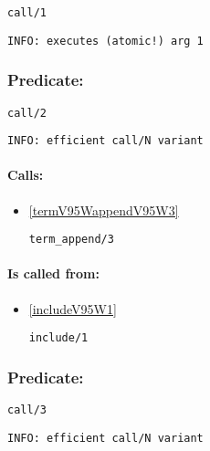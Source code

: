 \begin{verbatim}
call/1
\end{verbatim}

{\small \begin{verbatim}
INFO: executes (atomic!) arg 1

\end{verbatim}}

\subsubsection{Predicate:} \label{callV95W2}

\begin{verbatim}
call/2
\end{verbatim}

{\small \begin{verbatim}
INFO: efficient call/N variant

\end{verbatim}}
\paragraph{Calls:} 
\begin{itemize}
\item \ref{termV95WappendV95W3} 
\begin{verbatim}
term_append/3
\end{verbatim}

\end{itemize}
\paragraph{Is called from:} 
\begin{itemize}
\item \ref{includeV95W1} 
\begin{verbatim}
include/1
\end{verbatim}

\end{itemize}

\subsubsection{Predicate:} \label{callV95W3}

\begin{verbatim}
call/3
\end{verbatim}

{\small \begin{verbatim}
INFO: efficient call/N variant

\end{verbatim}}
